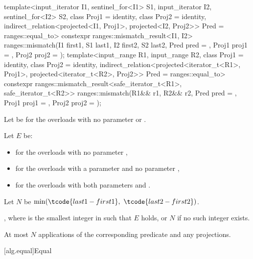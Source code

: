 \begin{itemdecl}
template<input_iterator I1, sentinel_for<I1> S1, input_iterator I2, sentinel_for<I2> S2,
         class Proj1 = identity, class Proj2 = identity,
         indirect_relation<projected<I1, Proj1>,
                           projected<I2, Proj2>> Pred = ranges::equal_to>
  constexpr ranges::mismatch_result<I1, I2>
    ranges::mismatch(I1 first1, S1 last1, I2 first2, S2 last2, Pred pred = {},
                     Proj1 proj1 = {}, Proj2 proj2 = {});
template<input_range R1, input_range R2,
         class Proj1 = identity, class Proj2 = identity,
         indirect_relation<projected<iterator_t<R1>, Proj1>,
                           projected<iterator_t<R2>, Proj2>> Pred = ranges::equal_to>
  constexpr ranges::mismatch_result<safe_iterator_t<R1>, safe_iterator_t<R2>>
    ranges::mismatch(R1&& r1, R2&& r2, Pred pred = {},
                     Proj1 proj1 = {}, Proj2 proj2 = {});
\end{itemdecl}

\begin{itemdescr}
\pnum
Let  be 
for the overloads with no parameter  or .

\pnum
Let $E$ be:
\begin{itemize}
\setlength{\emergencystretch}{1em}
\item
  for the overloads with no parameter ,
\item
  for the overloads with a parameter  and
  no parameter ,
\item
  for the overloads with both parameters  and .
\end{itemize}

\pnum
Let $N$ be $\min(\tcode{last1 - first1}, \ \tcode{last2 - first2})$.

\pnum
\returns
{},
where  is the smallest integer in  such that $E$ holds,
or $N$ if no such integer exists.

\pnum
\complexity
At most $N$ applications of the corresponding predicate and any projections.
\end{itemdescr}

[alg.equal]{Equal}

